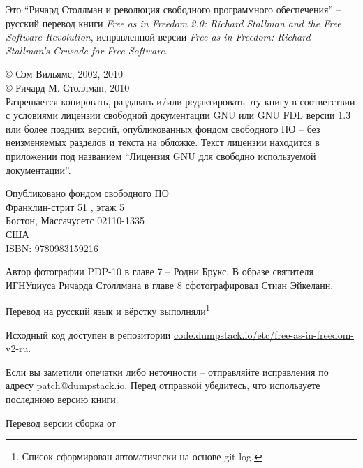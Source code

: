 \thispagestyle{plain}

\noindent Это \enquote{Ричард Столлман и революция свободного программного обеспечения} -- русский перевод книги \textit{Free as in Freedom 2.0: Richard Stallman and the Free Software Revolution}, исправленной версии \textit{Free as in Freedom: Richard Stallman's Crusade for Free Software}.

\bigskip

\noindent \copyright{} Сэм Вильямс, 2002, 2010\\
\copyright{} Ричард М. Столлман, 2010\\

Разрешается копировать, раздавать и/или редактировать эту книгу в соответствии с условиями лицензии свободной документации GNU или GNU FDL версии 1.3 или более поздних версий, опубликованных фондом свободного ПО -- без неизменяемых разделов и текста на обложке. Текст лицензии находится в приложении под названием \enquote{Лицензия GNU для свободно используемой документации}.

\bigskip

\noindent Опубликовано фондом свободного ПО\\
Франклин-стрит 51 , этаж 5\\
Бостон, Массачусетс 02110-1335\\
США\\
ISBN: 9780983159216\\

\bigskip

\noindent Автор фотографии PDP-10 в главе 7 -- Родни Брукс. В образе святителя ИГНУциуса Ричарда Столлмана в главе 8 сфотографировал Стиан Эйкеланн.

\bigskip

Перевод на русский язык и вёрстку выполняли\footnote{Список сформирован автоматически на основе git log.} 

Исходный код доступен в репозитории
\href{https://code.dumpstack.io/etc/free-as-in-freedom-v2-ru}{code.dumpstack.io/etc/free-as-in-freedom-v2-ru}.

Если вы заметили опечатки либо неточности -- отправляйте исправления по адресу
\href{mailto:patch@dumpstack.io}{patch@dumpstack.io}. Перед отправкой
убедитесь, что используете последнюю версию книги.

Перевод версии  сборка от 
